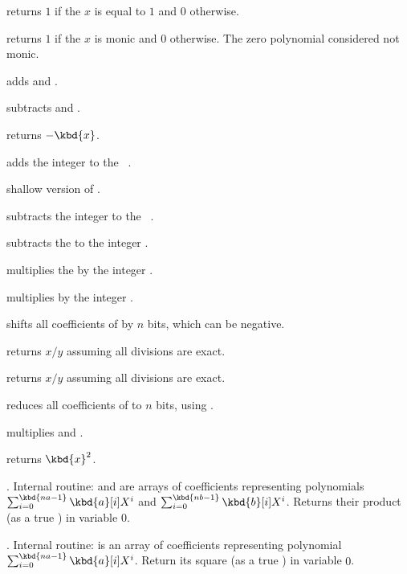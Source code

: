  returns $1$ if the  $x$ is equal to $1$
and $0$ otherwise.

 returns $1$ if the  $x$ is monic and $0$
otherwise.  The zero polynomial considered not monic.

 adds  and .

 subtracts  and .

 returns $-\kbd{x}$.

 adds the integer  to the
~.

 shallow version of .

 subtracts the integer  to the
~.

 subtracts the   to the
integer .

 multiplies the   by the
integer .

 multiplies  by the integer .

 shifts all coefficients of  by $n$
bits, which can be negative.

 returns $x/y$ assuming all divisions
are exact.

 returns $x/y$ assuming all divisions
are exact.

 reduces all coefficients of  to
$n$ bits, using .

 multiplies  and .

 returns $\kbd{x}^2$.

. Internal routine:
 and  are arrays of coefficients representing polynomials
$\sum_{i = 0}^{\kbd{na-1}} \kbd{a}[i] X^i$ and
$\sum_{i = 0}^{\kbd{nb-1}} \kbd{b}[i] X^i$. Returns their product (as a true
) in variable $0$.

. Internal routine:
 is an array of coefficients representing polynomial
$\sum_{i = 0}^{\kbd{na-1}} \kbd{a}[i] X^i$. Return its square (as a true
) in variable $0$.

